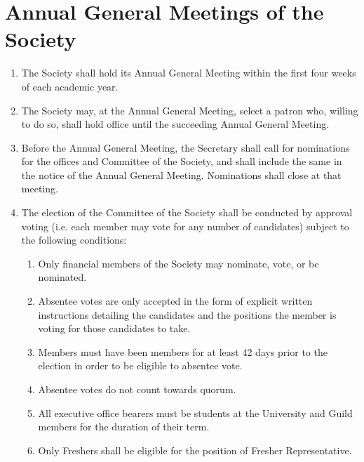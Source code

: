 \documentclass[a4paper]{article}
\newenvironment{enumsection}[1]{\section{#1} \begin{enumerate}[ref=\thesection.\theenumi]}{\end{enumerate}}
\begin{document}
\begin{enumsection}{Annual General Meetings of the Society} \label{sec:AGMs}
    \item The Society shall hold its Annual General Meeting within the first four weeks of each academic year.
    \item The Society may, at the Annual General Meeting, select a patron who, willing to do so, shall hold office until the succeeding Annual General Meeting.
    \item Before the Annual General Meeting, the Secretary shall call for nominations for the offices and Committee of the Society, and shall include the same in the notice of the Annual General Meeting. Nominations shall close at that meeting.
    \item The election of the Committee of the Society shall be conducted by approval voting (i.e. each member may vote for any number of candidates) subject to the following conditions:
    \begin{enumerate}
        \item Only financial members of the Society may nominate, vote, or be nominated.
        \item Absentee votes are only accepted in the form of explicit written instructions detailing the candidates and the positions the member is voting for those candidates to take.
        \item Members must have been members for at least 42 days prior to the election in order to be eligible to absentee vote.
        \item Absentee votes do not count towards quorum.
        \item All executive office bearers must be students at the University and Guild members for the duration of their term.
        \item \label{fresher_rep_requirement} Only Freshers shall be eligible for the position of Fresher Representative.
    \end{enumerate}
\end{enumsection}
\end{document}
